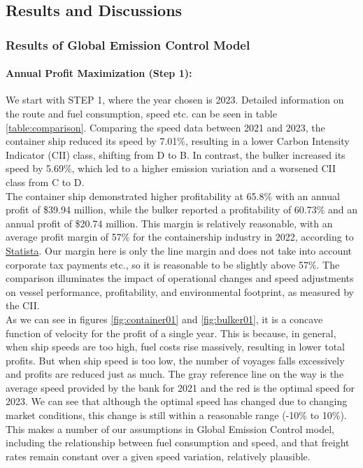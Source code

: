 \documentclass[a4paper,12pt]{article}
\begin{document}
\subsection{Results and Discussions}
\subsubsection{Results of Global Emission Control Model}
\paragraph{Annual Profit Maximization (Step 1):}
We start with STEP 1, where the year chosen is 2023. Detailed information on the route and fuel consumption, speed etc. can be seen in table \ref{table:comparison}.
Comparing the speed data between 2021 and 2023, the container ship reduced its speed by 7.01\%, resulting in a lower Carbon Intensity Indicator (CII) class, shifting from D to B.
In contrast, the bulker increased its speed by 5.69\%, which led to a higher emission variation and a worsened CII class from C to D.\\

The container ship demonstrated higher profitability at 65.8\% with an annual profit of \$39.94 million, while the bulker reported a profitability of 60.73\% and an annual profit of \$20.74 million.
This margin is relatively reasonable, with an average profit margin of 57\% for the containership industry in 2022, according to \href{https://www.statista.com/statistics/1263780/ebit-margins-of-container-carriers-by-quarter}{Statista}.
Our margin here is only the line margin and does not take into account corporate tax payments etc., so it is reasonable to be slightly above 57\%.
The comparison illuminates the impact of operational changes and speed adjustments on vessel performance, profitability, and environmental footprint, as measured by the CII.\\

As we can see in figures \ref{fig:container01} and \ref{fig:bulker01}, it is a concave function of velocity for the profit of a single year.
This is because, in general, when ship speeds are too high, fuel costs rise massively, resulting in lower total profits.
But when ship speed is too low, the number of voyages falls excessively and profits are reduced just as much.
The gray reference line on the way is the average speed provided by the bank for 2021 and the red is the optimal speed for 2023.
We can see that although the optimal speed has changed due to changing market conditions, this change is still within a reasonable range (-10\% to 10\%).
This makes a number of our assumptions in Global Emission Control model, including the relationship between fuel consumption and speed, and that freight rates remain constant over a given speed variation, relatively plausible.
\end{document}
